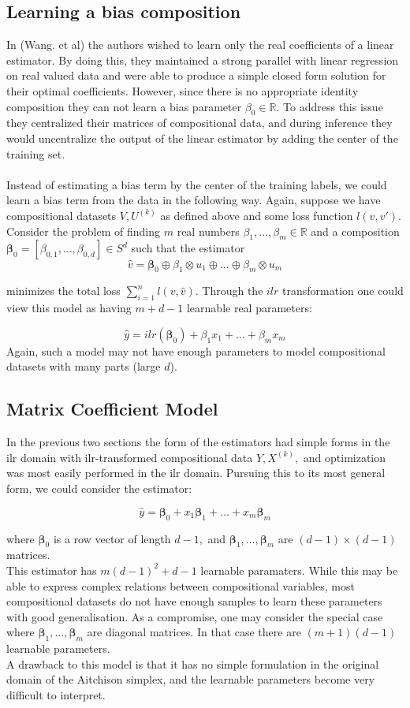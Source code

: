 \documentclass[BSc]{usydthesis}
\numberwithin{equation}{chapter}
\theoremstyle{remark}
\begin{document}
\subsection{Learning a bias composition}
In (Wang. et al) the authors wished to learn only the real coefficients of a linear estimator. By doing this, they maintained a strong parallel with linear regression on real valued data and were able to produce a simple closed form solution for their optimal coefficients. However, since there is no appropriate identity composition they can not learn a bias parameter $\beta_0 \in \mathbb{R}.$ To address this issue they centralized their matrices of compositional data, and during inference they would uncentralize the output of the linear estimator by adding the center of the training set. \
\\
\\
Instead of estimating a bias term by the center of the training labels, we could learn a bias term from the data in the following way. Again, suppose we have compositional datasets $V, U^{(k)}$ as defined above and some loss function $l(v, v')$. Consider the problem of finding $m$ real numbers $\beta_1,\ldots, \beta_m \in \mathbb{R}$ and a composition $\bm{\beta}_0 = [ \beta_{0, 1}, \ldots, \beta_{0, d} ] \in S^d$ such that the estimator
$$ \hat{v}  = \bm{\beta}_0 \oplus \beta_1 \otimes u_1 \oplus \ldots \oplus \beta_m \otimes u_m $$ 

minimizes the total loss $\sum_{i=1}^n l(v, \hat{v}).$ Through the $ilr$ transformation one could view this model as having $m + d-1$ learnable real parameters:

$$ \hat{y} = ilr(\bm{\beta}_0) + \beta_1 x_1 + \ldots + \beta_m x_m$$
Again, such a model may not have enough parameters to model compositional datasets with many parts (large $d$). 
\subsection{Matrix Coefficient Model}
In the previous two sections the form of the estimators had simple forms in the ilr domain with ilr-transformed compositional data $Y, X^{(k)},$ and optimization was most easily performed in the ilr domain. Pursuing this to its most general form, we could consider the estimator:

$$ \hat{y} = \bm{\beta}_0 + x_1 \bm{\beta}_1 + \ldots + x_m \bm{\beta}_m$$

where $\bm{\beta}_0$ is a row vector of length $d-1,$ and $\bm{\beta}_1, \ldots, \bm{\beta}_m$ are $(d-1) \times (d-1)$ matrices.  
\\
This estimator has $m(d-1)^2 + d-1$ learnable paramaters. While this may be able to express complex relations between compositional variables, most compositional datasets do not have enough samples to learn these parameters with good generalisation. As a compromise, one may consider the special case where $\bm{\beta}_1, \ldots, \bm{\beta}_m$ are diagonal matrices. In that case there are $(m+1)(d-1)$ learnable parameters.
\\
A drawback to this model is that it has no simple formulation in the original domain of the Aitchison simplex, and the learnable parameters become very difficult to interpret.  
\end{document}
